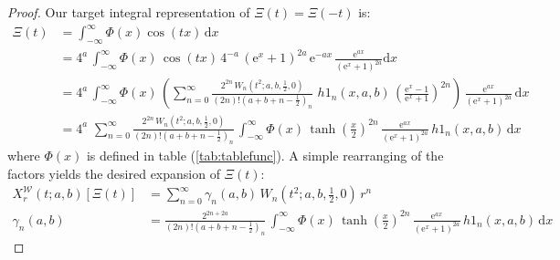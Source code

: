 \documentclass[a4paper,11pt,twoside]{amsart}
\newcommand{\verifiedeq}{=}
\newcommand{\verifiedeq}{\stackrel{\checkmark}{=}}
\begin{document}
\begin{proof}
Our target integral representation of $\Xi(t) = \Xi(-t)$ is:
\begin{align}
 \Xi(t) &\verifiedeq \int_{-\infty}^\infty \Phi(x)\cos(tx)\, \mathrm{d}x \\
 &\verifiedeq 4^a\,\int_{-\infty}^\infty \Phi(x)\,\cos(tx)\,4^{-a}\,(\mathrm{e}^x+1)^{2a}\,\mathrm{e}^{-ax} \,\frac{\mathrm{e}^{ax}}{(\mathrm{e}^x+1)^{2a}} \mathrm{d}x \\
 &\verifiedeq 4^a\,\int_{-\infty}^\infty \Phi(x)\,\left(\sum_{n=0}^\infty \frac{2^{2n}\,W_n\left(t^2;a,b,\frac12,0\right)}{(2n)!\left(a+b+n-\frac12\right)_n}\, \,h1_n(x,a,b)\,\left(\frac{\textrm{e}^{x}-1}{\textrm{e}^{x}+1}\right)^{2n}\right)\,\frac{\mathrm{e}^{ax}}{(\mathrm{e}^x+1)^{2a}}\, \mathrm{d}x \\
 &\verifiedeq 4^a\,\,\sum_{n=0}^\infty \frac{2^{2n}\,W_n\left(t^2;a,b,\frac12,0\right)}{(2n)!\left(a+b+n-\frac12\right)_n}\,\int_{-\infty}^{\infty} \Phi(x)\,\tanh\left(\frac{x}{2}\right)^{2n}\,\frac{\mathrm{e}^{ax}}{(\mathrm{e}^x+1)^{2a}}\,h1_n(x,a,b)\,\mathrm{d}x
\end{align}
where $\Phi(x)$ is defined in table (\ref{tab:tablefunc}). A simple rearranging of the factors yields the desired expansion of $\Xi(t)$:
\begin{align}
X^\mathcal{W}_r(t;a,b)\left[\Xi(t)\right] &\verifiedeq \sum_{n=0}^\infty \gamma_n(a,b)\,W_n\left(t^2;a,b,\frac12,0\right)\,r^n \\
  \gamma_n(a,b) &\verifiedeq \frac{2^{2n+2a}}{(2n)!\left(a+b+n-\frac12\right)_n}\,\int_{-\infty}^{\infty} \Phi(x)\,\tanh\left(\frac{x}{2}\right)^{2n}\,\frac{\mathrm{e}^{ax}}{(\mathrm{e}^x+1)^{2a}}\,h1_n(x,a,b)\,\mathrm{d}x
\end{align}


\end{proof}
\end{document}

